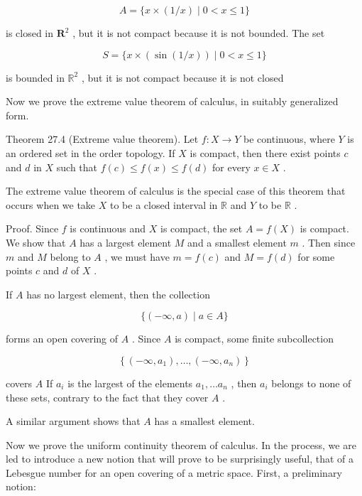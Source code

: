 \[
A = \{ x \times  \left( {1/x}\right)  \mid  0 < x \leq  1\}
\]

is closed in \({\mathbf{R}}^{2}\) , but it is not compact because it is not bounded. The set

\[
S = \{ x \times  \left( {\sin \left( {1/x}\right) }\right)  \mid  0 < x \leq  1\}
\]

is bounded in \({\mathbb{R}}^{2}\) , but it is not compact because it is not closed

Now we prove the extreme value theorem of calculus, in suitably generalized form.

Theorem 27.4 (Extreme value theorem). Let \(f : X \rightarrow  Y\) be continuous, where \(Y\) is an ordered set in the order topology. If \(X\) is compact, then there exist points \(c\) and \(d\) in \(X\) such that \(f\left( c\right)  \leq  f\left( x\right)  \leq  f\left( d\right)\) for every \(x \in  X\) .

The extreme value theorem of calculus is the special case of this theorem that occurs when we take \(X\) to be a closed interval in \(\mathbb{R}\) and \(Y\) to be \(\mathbb{R}\) .

Proof. Since \(f\) is continuous and \(X\) is compact, the set \(A = f\left( X\right)\) is compact. We show that \(A\) has a largest element \(M\) and a smallest element \(m\) . Then since \(m\) and \(M\) belong to \(A\) , we must have \(m = f\left( c\right)\) and \(M = f\left( d\right)\) for some points \(c\) and \(d\) of \(X\) .

If \(A\) has no largest element, then the collection

\[
\{ \left( {-\infty ,a}\right)  \mid  a \in  A\}
\]

forms an open covering of \(A\) . Since \(A\) is compact, some finite subcollection

\[
\left\{  {\left( {-\infty ,{a}_{1}}\right) ,\ldots ,\left( {-\infty ,{a}_{n}}\right) }\right\}
\]

covers \(A\) If \({a}_{i}\) is the largest of the elements \({a}_{1},\ldots {a}_{n}\) , then \({a}_{i}\) belongs to none of these sets, contrary to the fact that they cover \(A\) .

A similar argument shows that \(A\) has a smallest element.

Now we prove the uniform continuity theorem of calculus. In the process, we are led to introduce a new notion that will prove to be surprisingly useful, that of a Lebesgue number for an open covering of a metric space. First, a preliminary notion:

